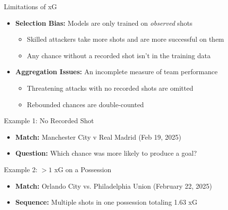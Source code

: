\documentclass{beamer}
\begin{document}
\begin{frame}{Limitations of xG}
\begin{itemize}
\item \textbf{Selection Bias:} Models are only trained on \emph{observed} shots
  \begin{itemize}
  \item Skilled attackers take more shots and are more successful on them
  \item Any chance without a recorded shot isn't in the training data
  \end{itemize}
\item \textbf{Aggregation Issues:} An incomplete measure of team performance
\begin{itemize}
  \item Threatening attacks with no recorded shots are omitted
  \item Rebounded chances are double-counted
\end{itemize}
\end{itemize}
\end{frame}

\begin{frame}[fragile]{Example 1: No Recorded Shot}
\begin{itemize}
\item \textbf{Match:} Manchester City v Real Madrid (Feb 19, 2025)
\item \textbf{Question:} Which chance was more likely to produce a goal?
\end{itemize}

\vspace{6cm}
\end{frame}

\begin{frame}{Example 2: $>1$ xG on a Possession}
\begin{itemize}
\item \textbf{Match:} Orlando City vs. Philadelphia Union (February 22, 2025)
\item \textbf{Sequence:} Multiple shots in one possession totaling 1.63 xG
\end{itemize}

\vspace{6cm}
\end{frame}
\end{document}
